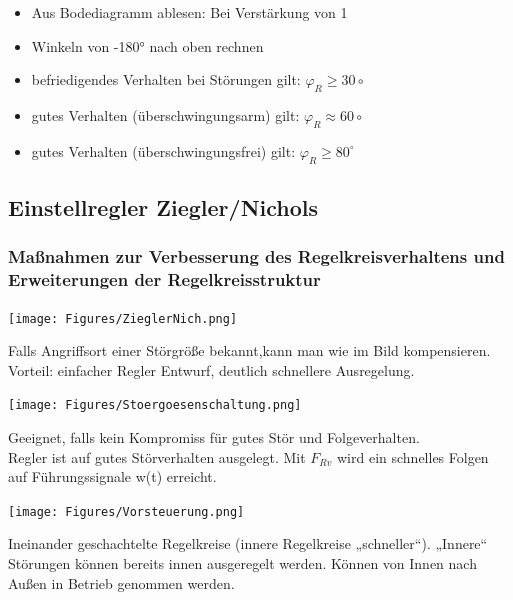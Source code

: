 \documentclass[10pt,a4paper]{article}
\begin{document}
\begin{itemize}[leftmargin=*]
	\item[] Aus Bodediagramm ablesen: Bei Verstärkung von 1
	\item[] Winkeln von -180° nach oben rechnen
	\item befriedigendes Verhalten bei Störungen gilt: $\varphi _R \geq 30\circ$
	\item gutes Verhalten (überschwingungsarm) gilt: $\varphi _R \approx  60\circ$
	\item gutes Verhalten (überschwingungsfrei) gilt: $\varphi _R \geq 80^\circ$
\end{itemize}

\subsection{Einstellregler Ziegler/Nichols}
\subsubsection{Maßnahmen zur Verbesserung des Regelkreisverhaltens und Erweiterungen der Regelkreisstruktur}

\centering
\texttt{[image: Figures/ZieglerNich.png]}\\

\raggedright
\begin{mdframed}[style=exercise, frametitle=Störgrößenaufschaltung:]
	Falls Angriffsort einer Störgröße bekannt,kann man wie im Bild kompensieren.\\
	Vorteil: einfacher Regler Entwurf, deutlich schnellere Ausregelung.
\end{mdframed}

\texttt{[image: Figures/Stoergoesenschaltung.png]}


\begin{mdframed}[style=exercise, frametitle=Vorsteuerung:]
	Geeignet, falls kein Kompromiss für gutes Stör und Folgeverhalten.\\
	Regler ist auf gutes Störverhalten ausgelegt. Mit $F_{Rv}$ wird ein schnelles Folgen
	auf Führungssignale w(t) erreicht.
\end{mdframed}

\texttt{[image: Figures/Vorsteuerung.png]}


\begin{mdframed}[style=exercise, frametitle=Kaskadenregelung:]
	Ineinander geschachtelte Regelkreise (innere Regelkreise „schneller“). „Innere“
	Störungen können bereits innen ausgeregelt werden. Können von Innen nach Außen in Betrieb genommen werden.
\end{mdframed}
\end{document}
